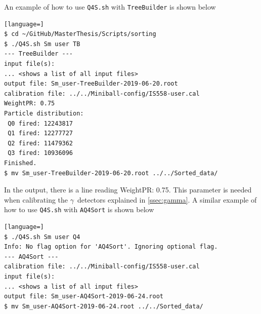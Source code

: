 \documentclass[twoside,english]{uiofysmaster/uiofysmaster}
\newcommand{\ga}{$\gamma$}
\let\orgautoref\autoref
\renewcommand{\autoref}
        {%
		 \def\sectionautorefname{Section}%
		 \def\subsectionautorefname{Section}%
		 \def\subsubsectionautorefname{Section}%
		 \def\chapterautorefname{Chapter}%
          \orgautoref}
\begin{document}

An example of how to use \texttt{Q4S.sh} with \texttt{TreeBuilder} is shown below
\begin{lstlisting}[language=]
$ cd ~/GitHub/MasterThesis/Scripts/sorting 
$ ./Q4S.sh Sm user TB
--- TreeBuilder ---
input file(s):
... <shows a list of all input files>
output file: Sm_user-TreeBuilder-2019-06-20.root
calibration file: ../../Miniball-config/IS558-user.cal
WeightPR: 0.75
Particle distribution:
 Q0 fired: 12243817
 Q1 fired: 12277727
 Q2 fired: 11479362
 Q3 fired: 10936096
Finished.
$ mv Sm_user-TreeBuilder-2019-06-20.root ../../Sorted_data/
\end{lstlisting}
In the output, there is a line reading WeightPR: 0.75. 
This parameter is needed when calibrating the \ga\ detectors explained in \autoref{ssec:gamma}. 
A similar example of how to use \texttt{Q4S.sh} with \texttt{AQ4Sort} is shown below
\begin{lstlisting}[language=]
$ ./Q4S.sh Sm user Q4
Info: No flag option for 'AQ4Sort'. Ignoring optional flag.
--- AQ4Sort ---
calibration file: ../../Miniball-config/IS558-user.cal
input file(s):
... <shows a list of all input files>
output file: Sm_user-AQ4Sort-2019-06-24.root
$ mv Sm_user-AQ4Sort-2019-06-24.root ../../Sorted_data/
\end{lstlisting}
\end{document}
